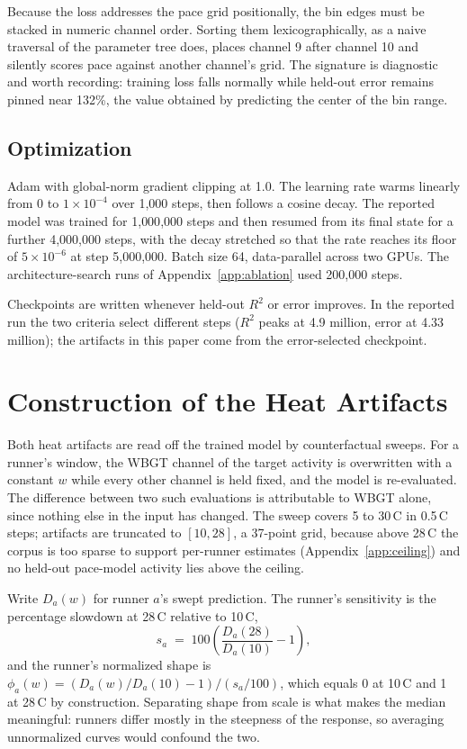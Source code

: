 Because the loss addresses the pace grid positionally, the bin edges must be stacked in numeric
channel order. Sorting them lexicographically, as a naive traversal of the parameter tree does,
places channel 9 after channel 10 and silently scores pace against another channel's grid. The
signature is diagnostic and worth recording: training loss falls normally while held-out error
remains pinned near 132\%, the value obtained by predicting the center of the bin range.

\subsection{Optimization}

Adam with global-norm gradient clipping at 1.0. The learning rate warms linearly from 0 to
$1\times10^{-4}$ over 1{,}000 steps, then follows a cosine decay. The reported model was trained for 1{,}000{,}000 steps and then resumed from its final state for a further 4{,}000{,}000 steps, with the decay stretched so that the rate reaches its floor of $5\times10^{-6}$ at step 5{,}000{,}000. Batch size 64, data-parallel across two GPUs. The architecture-search runs of Appendix~\ref{app:ablation} used 200{,}000 steps.

Checkpoints are written whenever held-out $R^2$ or error improves. In the reported run the two criteria
select different steps ($R^2$ peaks at 4.9 million, error at 4.33 million); the artifacts in this paper come
from the error-selected checkpoint.

\section{Construction of the Heat Artifacts}
\label{app:curve}

Both heat artifacts are read off the trained model by counterfactual sweeps. For a runner's window,
the WBGT channel of the target activity is overwritten with a constant $w$ while every other channel
is held fixed, and the model is re-evaluated. The difference between two such evaluations is
attributable to WBGT alone, since nothing else in the input has changed. The sweep covers 5 to
30\,\textdegree C in 0.5\,\textdegree C steps; artifacts are truncated to $[10, 28]$, a 37-point
grid, because above 28\,\textdegree C the corpus is too sparse to support per-runner estimates
(Appendix~\ref{app:ceiling}) and no held-out pace-model activity lies above the ceiling.

Write $D_a(w)$ for runner $a$'s swept prediction. The runner's sensitivity is the percentage
slowdown at 28\,\textdegree C relative to 10\,\textdegree C,
\begin{equation}
  s_a \;=\; 100\left(\frac{D_a(28)}{D_a(10)} - 1\right),
\end{equation}
and the runner's normalized shape is $\phi_a(w) = \left(D_a(w)/D_a(10) - 1\right)\big/ (s_a/100)$,
which equals 0 at 10\,\textdegree C and 1 at 28\,\textdegree C by construction. Separating shape
from scale is what makes the median meaningful: runners differ mostly in the steepness of the
response, so averaging unnormalized curves would confound the two.

